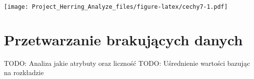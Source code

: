 \documentclass[]{article}
\begin{document}
\texttt{[image: Project\_Herring\_Analyze\_files/figure-latex/cechy7-1.pdf]}

\hypertarget{przetwarzanie-brakujux105cych-danych}{%
\section{Przetwarzanie brakujących
danych}\label{przetwarzanie-brakujux105cych-danych}}

TODO: Analiza jakie atrybuty oraz liczność TODO: Uśrednienie wartości
bazując na rozkładzie
\end{document}
